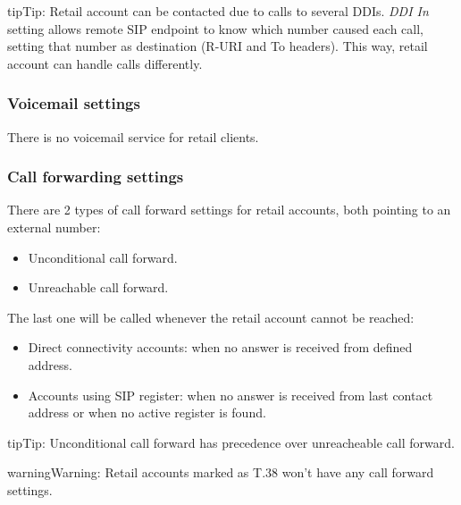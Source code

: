 \documentclass[letterpaper,10pt,english]{sphinxmanual}
\begin{document}
\begin{notice}{tip}{Tip:}
Retail account can be contacted due to calls to several DDIs. \emph{DDI In} setting allows remote SIP endpoint to
know which number caused each call, setting that number as destination (R-URI and To headers). This way, retail
account can handle calls differently.
\end{notice}


\subsubsection{Voicemail settings}
\label{administration_portal/client/retail/retail_accounts:voicemail-settings}
There is no voicemail service for retail clients.


\subsubsection{Call forwarding settings}
\label{administration_portal/client/retail/retail_accounts:call-forwarding-settings}
There are 2 types of call forward settings for retail accounts, both pointing to an external number:
\begin{itemize}
\item {} 
Unconditional call forward.

\item {} 
Unreachable call forward.

\end{itemize}

The last one will be called whenever the retail account cannot be reached:
\begin{itemize}
\item {} 
Direct connectivity accounts: when no answer is received from defined address.

\item {} 
Accounts using SIP register: when no answer is received from last contact address or when no active register is found.

\end{itemize}

\begin{notice}{tip}{Tip:}
Unconditional call forward has precedence over unreacheable call forward.
\end{notice}

\begin{notice}{warning}{Warning:}
Retail accounts marked as T.38 won't have any call forward settings.
\end{notice}
\end{document}

